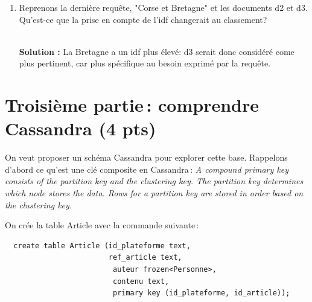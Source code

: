 \documentclass[11pt,a4paper]{article}
\newenvironment{solution}[0]{
~\\ \color{red} \textbf{Solution : }\color{black}}{%
}
\begin{document}
\begin{enumerate}
\begin{solution}
\begin{itemize}
       d4 est premier car il mentionne deux fois la Normandie.
  
  \item Alsace et Corse 
  
    d1 : $\frac{2+1}{\sqrt{5}}$; 
    d2 : $\frac{1+1}{2}$;
     d4 : $\frac{1}{\sqrt{5}}$; 
    
    d1 est premier comme on pouvait s'y attendre: il parle exclusivement
    de la Corse et de l'Alsace. Viennent ensuite d2 puis d4.
    
  \item Corse et Bretagne.
  
    d1 : $\frac{1}{\sqrt{5}}$; 
    d2 : $\frac{2}{2}$;
    d3 :  $\frac{1}{1}$  
    d4 :  $\frac{1}{\sqrt{5}}$  
    
  d2 et d3 arrivent à égalité. Intuitivement, il parlent tous les deux "à moitié"
   de Corse et de Bretagne.  d1 et d4 parlent de Corse \emph{ou} de Bretagne et aussi des autres
    pays.
 \end{itemize}

\end{solution}  
    
    \item Reprenons la dernière requête, "Corse et Bretagne" et les documents d2 et d3.
       Qu'est-ce que la prise en compte de l'idf changerait au classement?
    
\begin{solution}
La Bretagne a un idf plus élevé: d3 serait donc considéré come plus pertinent, 
car plus spécifique au besoin exprimé par la requête.
\end{solution}

  \end{enumerate}


\section*{Troisième partie\,: comprendre Cassandra (4 pts)}

  On veut proposer un schéma Cassandra pour explorer cette base. 
  Rappelons d'abord ce qu'est une clé composite en Cassandra\,: 
  \textit{A compound primary key consists of the partition key and the clustering key. The partition key determines 
  which node stores the data. Rows 
  for a partition key are stored in order based on the clustering key.} 

  On crée la table Article avec la commande suivante\,:
\begin{verbatim}
  create table Article (id_plateforme text,
                        ref_article text,
                         auteur frozen<Personne>,
                         contenu text,
                         primary key (id_plateforme, id_article));
  \end{verbatim}
\end{document}
